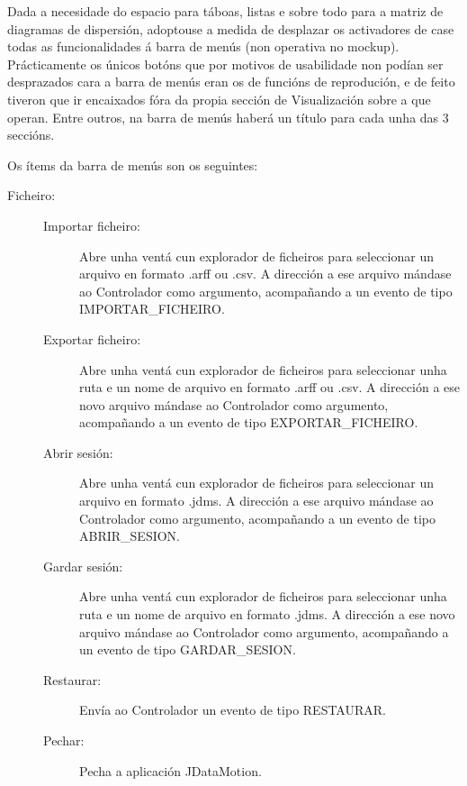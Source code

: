 Dada a necesidade do espacio para táboas, listas e sobre todo para a matriz de diagramas de dispersión, adoptouse a medida de desplazar os activadores de case todas as funcionalidades á barra de menús (non operativa no mockup). Prácticamente os únicos botóns que por motivos de usabilidade non podían ser desprazados cara a barra de menús eran os de funcións de reprodución, e de feito tiveron que ir encaixados fóra da propia sección de Visualización sobre a que operan. Entre outros, na barra de menús haberá un título para cada unha das 3 seccións.

Os ítems da barra de menús son os seguintes:

\begin{description}

\item[Ficheiro:] \hfill

\begin{description}

\item[Importar ficheiro:] \hfill
Abre unha ventá cun explorador de ficheiros para seleccionar un arquivo en formato .arff ou .csv. A dirección a ese arquivo mándase ao Controlador como argumento, acompañando a un evento de tipo IMPORTAR\_FICHEIRO.

\item[Exportar ficheiro:] \hfill
Abre unha ventá cun explorador de ficheiros para seleccionar unha ruta e un nome de arquivo en formato .arff ou .csv. A dirección a ese novo arquivo mándase ao Controlador como argumento, acompañando a un evento de tipo EXPORTAR\_FICHEIRO.

\item[Abrir sesión:] \hfill
Abre unha ventá cun explorador de ficheiros para seleccionar un arquivo en formato .jdms. A dirección a ese arquivo mándase ao Controlador como argumento, acompañando a un evento de tipo ABRIR\_SESION.

\item[Gardar sesión:] \hfill
Abre unha ventá cun explorador de ficheiros para seleccionar unha ruta e un nome de arquivo en formato .jdms. A dirección a ese novo arquivo mándase ao Controlador como argumento, acompañando a un evento de tipo GARDAR\_SESION.

\item[Restaurar:] \hfill
Envía ao Controlador un evento de tipo RESTAURAR.

\item[Pechar:] \hfill
Pecha a aplicación JDataMotion.


\end{description}
\end{description}
